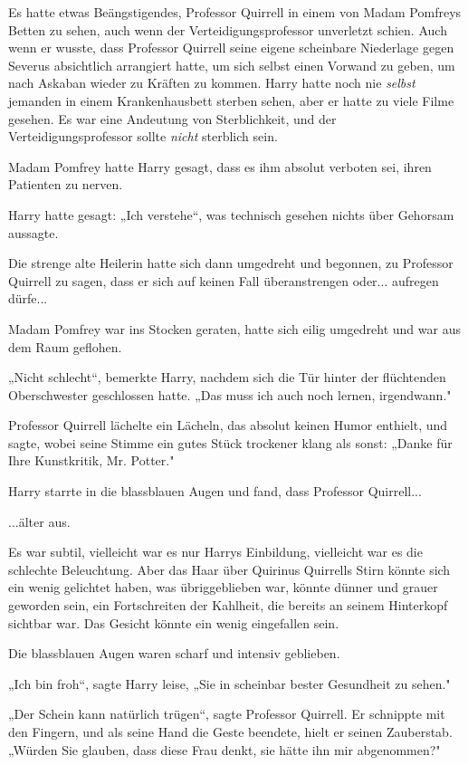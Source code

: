 {Es hatte etwas Beängstigendes, Professor Quirrell in einem von Madam Pomfreys Betten zu sehen, auch wenn der Verteidigungsprofessor unverletzt schien. Auch wenn er wusste, dass Professor Quirrell seine eigene scheinbare Niederlage gegen Severus absichtlich arrangiert hatte, um sich selbst einen Vorwand zu geben, um nach Askaban wieder zu Kräften zu kommen. Harry hatte noch nie \emph{selbst} jemanden in einem Krankenhausbett sterben sehen, aber er hatte zu viele Filme gesehen. Es war eine Andeutung von Sterblichkeit, und der Verteidigungsprofessor sollte \emph{nicht} sterblich sein.

Madam Pomfrey hatte Harry gesagt, dass es ihm absolut verboten sei, ihren Patienten zu nerven.

Harry hatte gesagt: „Ich verstehe“, was technisch gesehen nichts über Gehorsam aussagte.

Die strenge alte Heilerin hatte sich dann umgedreht und begonnen, zu Professor Quirrell zu sagen, dass er sich auf keinen Fall überanstrengen oder... aufregen dürfe...

Madam Pomfrey war ins Stocken geraten, hatte sich eilig umgedreht und war aus dem Raum geflohen.

„Nicht schlecht“, bemerkte Harry, nachdem sich die Tür hinter der flüchtenden Oberschwester geschlossen hatte. „Das muss ich auch noch lernen, irgendwann."

Professor Quirrell lächelte ein Lächeln, das absolut keinen Humor enthielt, und sagte, wobei seine Stimme ein gutes Stück trockener klang als sonst: „Danke für Ihre Kunstkritik, Mr. Potter."

Harry starrte in die blassblauen Augen und fand, dass Professor Quirrell...

...älter aus.

Es war subtil, vielleicht war es nur Harrys Einbildung, vielleicht war es die schlechte Beleuchtung. Aber das Haar über Quirinus Quirrells Stirn könnte sich ein wenig gelichtet haben, was übriggeblieben war, könnte dünner und grauer geworden sein, ein Fortschreiten der Kahlheit, die bereits an seinem Hinterkopf sichtbar war. Das Gesicht könnte ein wenig eingefallen sein.

Die blassblauen Augen waren scharf und intensiv geblieben.

„Ich bin froh“, sagte Harry leise, „Sie in scheinbar bester Gesundheit zu sehen."

„Der Schein kann natürlich trügen“, sagte Professor Quirrell. Er schnippte mit den Fingern, und als seine Hand die Geste beendete, hielt er seinen Zauberstab. „Würden Sie glauben, dass diese Frau denkt, sie hätte ihn mir abgenommen?"

}
